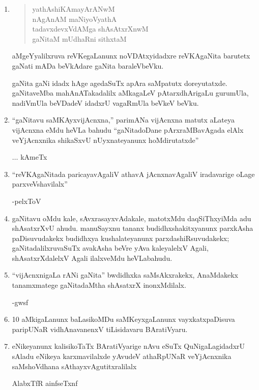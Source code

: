\begin{enumerate}[\rm 1)]
\item
\begin{center} 
\begin{verse}
yathAshiKAmayArANwM\\
nAgAnAM maNiyoVyathA\\
tadavxdevxVdAMga shAsAtxrXnwM\\
gaNitaM mUdhaRni sithxtaM
\end{verse}
\end{center}
aMgeYyalilxruva reVKegaLanunx noVDAtxyidadxre reVKAgaNita barutetx gaNati mADa beVkAdare gaNita baraleVbeVku.

gaNita gaNi idadx hAge agedaSuTx apAra saMpatutx doreyutatxde. gaNitaveMba mahAnATakadalilx aMkagaLeV pAtarxdhArigaLu gurumUla, nadiVmUla beVDadeV idadxrU vagaRmUla beVkeV beVku.

\item ``gaNitavu saMKAyxvijAcnxna,'' parimANa vijAcnxna matutx aLateya vijAcnxna eMdu heVLa bahudu ``gaNitadoDane pArxraMBavAgada elAlx veYjAcnxnika shikaSxvU nUyxnateyanunx hoMdirutatxde'' 
\begin{flushright}
$\ldots$  kAmeTx
\end{flushright}

\item ``reVKAgaNitada paricayavAgaliV athavA jAcnxnavAgaliV iradavarige oLage parxveVshavilalx''
\begin{flushright}
-pelxToV
\end{flushright}

\item gaNitavu oMdu kale, sAvxrasayxvAdakale, matotxMdu daqSiThxyiMda adu shAsatxrXvU ahudu. manuSayxnu tananx budidhxshakitxyanunx parxkAsha paDisuvudakekx budidhxya kushalateyanunx parxdashiRsuvudakekx; gaNitadalilxruvaSuTx avakAsha beVre yAva kaleyalelxV Agali, shAsatxrXdalelxV Agali ilalxveMdu heVLabahudu.

\item ``vijAcnxnigaLa rANi gaNita'' bwdidhxka saMsAkxrakekx, AnaMdakekx tanamxmatege gaNitadaMtha shAsatxrX inonxMdilalx.
\begin{flushright}
-gwsf
\end{flushright}

\item {\rm 10} aMkigaLanunx baLasikoMDu saMKeyxgaLanunx vayxkatxpaDisuva paripUNaR vidhAna\-vanenxV tiLisidavaru BAratiVyaru.

\item eNikeyanunx kalisikoTaTx BAratiVyarige nAvu eSuTx QuNigaLagidadxrU sAladu eNikeya karxmavilalxde yAvudeV athaRpUNaR veYjAcnxnika saMshoVdhana sAthayx\-vAgutitxralilalx
\begin{flushright}
AlabxTfR ainfseTxnf
\end{flushright}


\end{enumerate}
